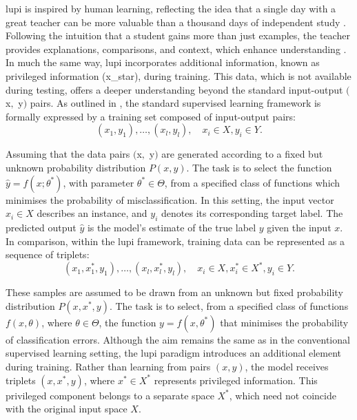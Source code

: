 \gls{lupi} is inspired by human learning, reflecting the idea that a single day with a great teacher can be more valuable than a thousand days of independent study \cite{lupi_distillation, lupi}. Following the intuition that a student gains more than just examples, the teacher provides explanations, comparisons, and context, which enhance understanding \cite{lupi, lupi_distillation, lupi_nips}.
In much the same way, \gls{lupi} incorporates additional information, known as privileged information (\gls{x_star}), during training. This data, which is not available during testing, offers a deeper understanding beyond the standard input-output $($\gls{x}$ ,$ \gls{y}$)$ pairs. 
As outlined in \cite{lupi}, the standard supervised learning framework is formally expressed by a training set composed of input-output pairs:
\begin{equation} \label{eq:supervised_learning}
(x_1, y_1), \dots, (x_l, y_l), \quad x_i \in X, y_i \in Y  .
\end{equation}

\noindent Assuming that the data pairs $($\gls{x}$ ,$ \gls{y}$)$ are generated according to a fixed but unknown probability distribution \(P(x, y)\). The task is to select the function \(\hat{y} = f(x; \theta^{*})\), with parameter \(\theta^{*} \in \Theta\), from a specified class of functions which minimises the probability of misclassification. In this setting, the input vector \(x_i \in X\) describes an instance, and \(y_i\) denotes its corresponding target label. The predicted output \(\hat{y}\) is the model's estimate of the true label \(y\) given the input \(x\).
In comparison, within the \gls{lupi} framework, training data can be represented as a sequence of triplets:
\begin{equation} \label{eq:lupi_pairs}
(x_1, x_1^*, y_1), \dots, (x_l, x_l^*, y_l), \quad x_i \in X , x_i^* \in X^*, y_i \in Y .
\end{equation}

\noindent These samples are assumed to be drawn from an unknown but fixed probability distribution \( P(x, x^*, y) \). The task is to select, from a specified class of functions \( f(x, \theta) \), where \( \theta \in \Theta \), the function \( y = f(x, \theta^*) \) that minimises the probability of classification errors.
Although the aim remains the same as in the conventional supervised learning setting, the \gls{lupi} paradigm introduces an additional element during training. Rather than learning from pairs \( (x, y) \), the model receives triplets \( (x, x^*, y) \), where \( x^* \in X^* \) represents privileged information. This privileged component belongs to a separate space \( X^* \), which need not coincide with the original input space \( X \).

